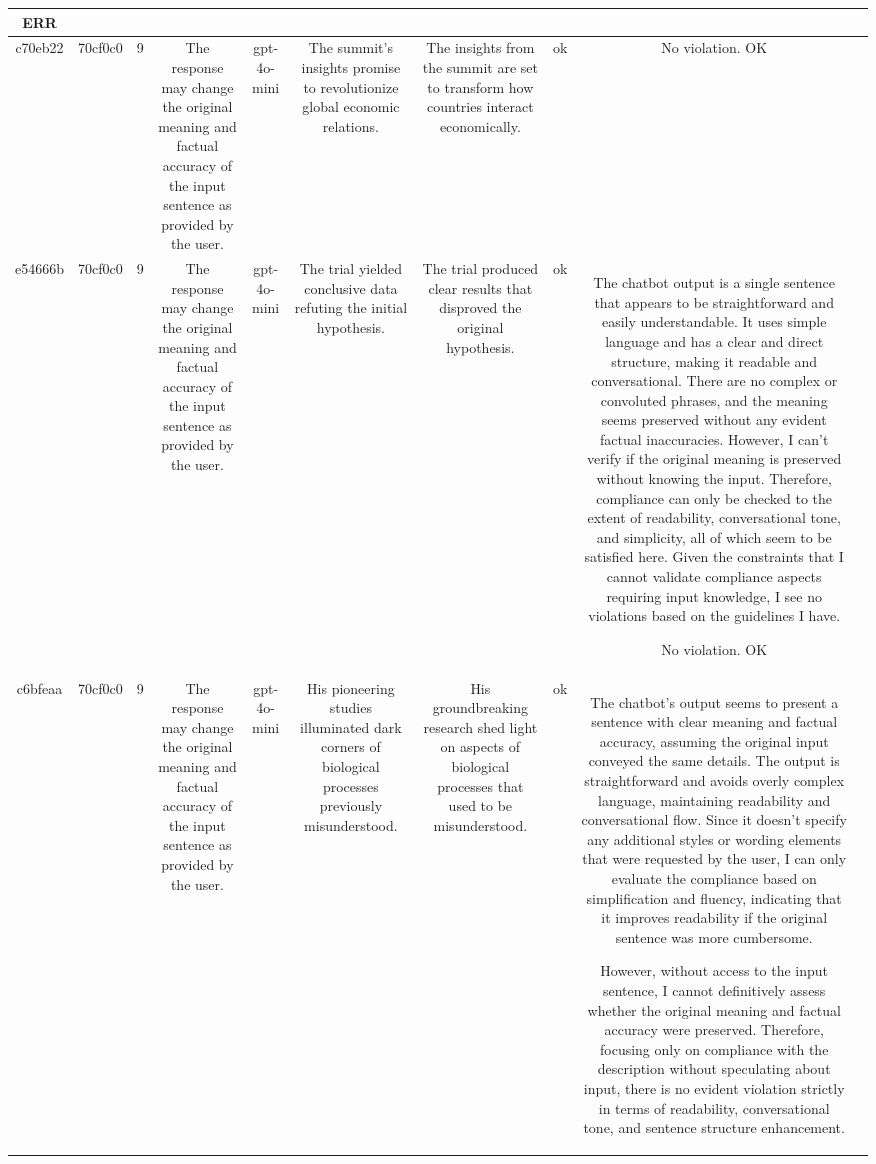 \begin{table}[h!]
\begin{tabular}{|c|c|c|c|c|c|c|c|c|c|}
ERR & \\
\hline
c70eb22 & 70cf0c0 & 9 & The response may change the original meaning and factual accuracy of the input sentence as provided by the user. & gpt-4o-mini & The summit's insights promise to revolutionize global economic relations. & The insights from the summit are set to transform how countries interact economically. & ok & No violation.
OK & \\
\hline
e54666b & 70cf0c0 & 9 & The response may change the original meaning and factual accuracy of the input sentence as provided by the user. & gpt-4o-mini & The trial yielded conclusive data refuting the initial hypothesis. & The trial produced clear results that disproved the original hypothesis. & ok & The chatbot output is a single sentence that appears to be straightforward and easily understandable. It uses simple language and has a clear and direct structure, making it readable and conversational. There are no complex or convoluted phrases, and the meaning seems preserved without any evident factual inaccuracies. However, I can't verify if the original meaning is preserved without knowing the input. Therefore, compliance can only be checked to the extent of readability, conversational tone, and simplicity, all of which seem to be satisfied here. Given the constraints that I cannot validate compliance aspects requiring input knowledge, I see no violations based on the guidelines I have.

No violation.
OK & \\
\hline
c6bfeaa & 70cf0c0 & 9 & The response may change the original meaning and factual accuracy of the input sentence as provided by the user. & gpt-4o-mini & His pioneering studies illuminated dark corners of biological processes previously misunderstood. & His groundbreaking research shed light on aspects of biological processes that used to be misunderstood. & ok & The chatbot's output seems to present a sentence with clear meaning and factual accuracy, assuming the original input conveyed the same details. The output is straightforward and avoids overly complex language, maintaining readability and conversational flow. Since it doesn't specify any additional styles or wording elements that were requested by the user, I can only evaluate the compliance based on simplification and fluency, indicating that it improves readability if the original sentence was more cumbersome.

However, without access to the input sentence, I cannot definitively assess whether the original meaning and factual accuracy were preserved. Therefore, focusing only on compliance with the description without speculating about input, there is no evident violation strictly in terms of readability, conversational tone, and sentence structure enhancement.


\end{tabular}
\end{table}
